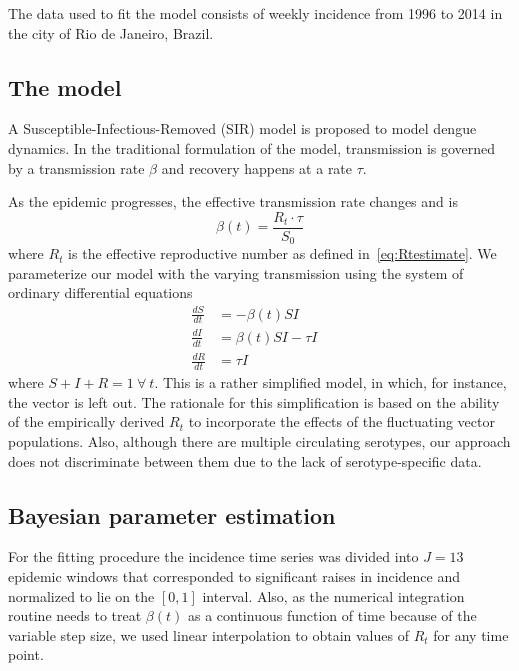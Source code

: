 The data used to fit the model consists of weekly incidence from 1996 to 2014 
in the city of Rio de Janeiro, Brazil.

\subsection*{The model}

A Susceptible-Infectious-Removed (SIR) model is proposed to model dengue dynamics.
In the traditional formulation of the model, transmission is governed by a 
transmission rate $\beta$ and recovery happens at a rate $\tau$.

As the epidemic progresses, the effective transmission  rate changes and is
\begin{equation} 
 \label{eq:effbeta}
 \beta(t) = \frac{R_t\cdot\tau}{S_0}
\end{equation}
where $R_t$ is the effective reproductive number as defined 
in~\ref{eq:Rtestimate}.
We parameterize our model with the varying transmission using the system of 
ordinary differential equations
\begin{align}
   \label{eq:model}
 \frac{dS}{dt} &= -\beta(t)SI \\     \nonumber
 \frac{dI}{dt} &= \beta(t)SI - \tau I&\\      \nonumber
 \frac{dR}{dt} &= \tau I&
\end{align}  
where $S + I + R = 1 \: \forall\: t$. %
This is a rather simplified model, in which, for instance, the vector is left 
out.
The rationale for this simplification is based on the ability of the 
empirically derived $R_t$  to incorporate the effects of the fluctuating vector 
populations.
Also, although there are multiple circulating serotypes, our approach
does not discriminate between them due to the lack of serotype-specific data.


\subsection*{Bayesian parameter estimation}

For the fitting procedure the incidence time series was divided into $J=13$ 
epidemic 
windows that corresponded to significant raises in incidence and normalized to 
lie on the $[0,1]$ interval.
Also, as the numerical integration routine needs to treat $\beta(t)$ as a
continuous function of time because of the variable step size, we used linear 
interpolation to obtain values of $R_t$ for any time point.

